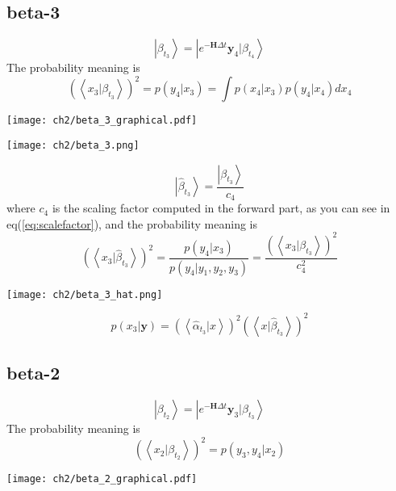 \subsection{beta-3}
\begin{definition}
\begin{equation}
        \left|\beta_{t_3}  \right> =  \left| e^{-\textbf{H}\Delta t} \textbf{y}_4 |\beta_{t_4} \right>
\end{equation}
The probability meaning is
\begin{equation}
   \left( \left<x_3 |\beta_{t_3}  \right> \right)^2 = p(y_4 | x_3) = \int p(x_4 | x_3) p(y_4 | x_4) dx_4
\end{equation}
\begin{center}
        \texttt{[image: ch2/beta\_3\_graphical.pdf]}
\end{center}
\begin{center}
        \texttt{[image: ch2/beta\_3.png]}
\end{center}
\end{definition}

\begin{definition}
\begin{equation}
        \left| \hat{\beta}_{t_{3}} \right> = \frac{ \left| \beta_{t_{3}} \right> }{ c_4 }
\end{equation}
where $c_4$ is the scaling factor computed in the forward part, as you can see in eq(\ref{eq:scalefactor}), and 
the probability meaning is
\begin{equation}
        \left(\left<x_3|\hat{\beta}_{t_{3}} \right>\right)^2 = \frac{p(y_4|x_3)}{p(y_4|y_1,y_2,y_3)} 
        =  \frac{ (\left<x_3|\beta_{t_{3}} \right>)^2 }{ c_4^2 }
\end{equation}
\begin{center}
        \texttt{[image: ch2/beta\_3\_hat.png]}
\end{center}
\begin{equation}
        p(x_3|\textbf{y}) = (\left<\hat{\alpha}_{t_{3}}|x \right>)^2 \left(\left<x|\hat{\beta}_{t_{3}} \right>\right)^2
\end{equation} 
\end{definition}

\subsection{beta-2}
\begin{definition}
\begin{equation}
        \left|\beta_{t_2}  \right> =  \left| e^{-\textbf{H}\Delta t} \textbf{y}_3 |\beta_{t_3} \right>
\end{equation}
The probability meaning is
\begin{equation}
           \left( \left<x_2 |\beta_{t_2}  \right> \right)^2 = p(y_3, y_4 | x_2)
\end{equation}
\begin{center}
        \texttt{[image: ch2/beta\_2\_graphical.pdf]}
\end{center}       
\end{definition}

